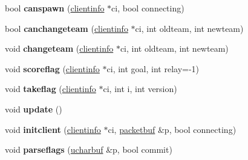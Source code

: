 \begin{DoxyCompactItemize}
bool {\bfseries canspawn} (\hyperlink{structserver_1_1clientinfo}{clientinfo} $\ast$ci, bool connecting)
\item 
\mbox{\label{structserver_1_1ctfservmode_ace8ad4b56e8763e7227a58511d19617c}} 
bool {\bfseries canchangeteam} (\hyperlink{structserver_1_1clientinfo}{clientinfo} $\ast$ci, int oldteam, int newteam)
\item 
\mbox{\label{structserver_1_1ctfservmode_a8c5e5155e6cfb7956c460ffcdf2955b1}} 
void {\bfseries changeteam} (\hyperlink{structserver_1_1clientinfo}{clientinfo} $\ast$ci, int oldteam, int newteam)
\item 
\mbox{\label{structserver_1_1ctfservmode_a56f00670fe165ee35413d3a6debe5dd2}} 
void {\bfseries scoreflag} (\hyperlink{structserver_1_1clientinfo}{clientinfo} $\ast$ci, int goal, int relay=-\/1)
\item 
\mbox{\label{structserver_1_1ctfservmode_ab0dfb3594347f3e282d589e53a5b7068}} 
void {\bfseries takeflag} (\hyperlink{structserver_1_1clientinfo}{clientinfo} $\ast$ci, int i, int version)
\item 
\mbox{\label{structserver_1_1ctfservmode_a41c651d043609f8633323e698288a820}} 
void {\bfseries update} ()
\item 
\mbox{\label{structserver_1_1ctfservmode_af95ad62d23a9b295cfcac8a9ea96ba40}} 
void {\bfseries initclient} (\hyperlink{structserver_1_1clientinfo}{clientinfo} $\ast$ci, \hyperlink{structpacketbuf}{packetbuf} \&p, bool connecting)
\item 
\mbox{\label{structserver_1_1ctfservmode_a5b62660b25ef739a6ebbb9f024f9a07a}} 
void {\bfseries parseflags} (\hyperlink{structdatabuf}{ucharbuf} \&p, bool commit)
\end{DoxyCompactItemize}

